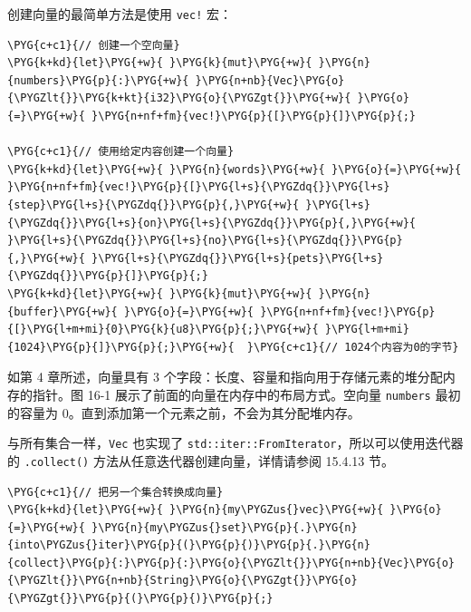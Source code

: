 创建向量的最简单方法是使用 \texttt{vec!} 宏：

\begin{Verbatim}[commandchars=\\\{\},breaklines=true,breakanywhere=true,fontsize=\codefont,xleftmargin=17bp]
\PYG{c+c1}{// 创建一个空向量}
\PYG{k+kd}{let}\PYG{+w}{ }\PYG{k}{mut}\PYG{+w}{ }\PYG{n}{numbers}\PYG{p}{:}\PYG{+w}{ }\PYG{n+nb}{Vec}\PYG{o}{\PYGZlt{}}\PYG{k+kt}{i32}\PYG{o}{\PYGZgt{}}\PYG{+w}{ }\PYG{o}{=}\PYG{+w}{ }\PYG{n+nf+fm}{vec!}\PYG{p}{[}\PYG{p}{]}\PYG{p}{;}

\PYG{c+c1}{// 使用给定内容创建一个向量}
\PYG{k+kd}{let}\PYG{+w}{ }\PYG{n}{words}\PYG{+w}{ }\PYG{o}{=}\PYG{+w}{ }\PYG{n+nf+fm}{vec!}\PYG{p}{[}\PYG{l+s}{\PYGZdq{}}\PYG{l+s}{step}\PYG{l+s}{\PYGZdq{}}\PYG{p}{,}\PYG{+w}{ }\PYG{l+s}{\PYGZdq{}}\PYG{l+s}{on}\PYG{l+s}{\PYGZdq{}}\PYG{p}{,}\PYG{+w}{ }\PYG{l+s}{\PYGZdq{}}\PYG{l+s}{no}\PYG{l+s}{\PYGZdq{}}\PYG{p}{,}\PYG{+w}{ }\PYG{l+s}{\PYGZdq{}}\PYG{l+s}{pets}\PYG{l+s}{\PYGZdq{}}\PYG{p}{]}\PYG{p}{;}
\PYG{k+kd}{let}\PYG{+w}{ }\PYG{k}{mut}\PYG{+w}{ }\PYG{n}{buffer}\PYG{+w}{ }\PYG{o}{=}\PYG{+w}{ }\PYG{n+nf+fm}{vec!}\PYG{p}{[}\PYG{l+m+mi}{0}\PYG{k}{u8}\PYG{p}{;}\PYG{+w}{ }\PYG{l+m+mi}{1024}\PYG{p}{]}\PYG{p}{;}\PYG{+w}{  }\PYG{c+c1}{// 1024个内容为0的字节}
\end{Verbatim}

如第 4 章所述，向量具有 3 个字段：长度、容量和指向用于存储元素的堆分配内存的指针。图 16-1 展示了前面的向量在内存中的布局方式。空向量 \texttt{numbers} 最初的容量为 0。直到添加第一个元素之前，不会为其分配堆内存。


与所有集合一样，\texttt{Vec} 也实现了 \texttt{std::iter::FromIterator}，所以可以使用迭代器的 \texttt{.collect()} 方法从任意迭代器创建向量，详情请参阅 15.4.13 节。

\begin{Verbatim}[commandchars=\\\{\},breaklines=true,breakanywhere=true,fontsize=\codefont,xleftmargin=17bp]
\PYG{c+c1}{// 把另一个集合转换成向量}
\PYG{k+kd}{let}\PYG{+w}{ }\PYG{n}{my\PYGZus{}vec}\PYG{+w}{ }\PYG{o}{=}\PYG{+w}{ }\PYG{n}{my\PYGZus{}set}\PYG{p}{.}\PYG{n}{into\PYGZus{}iter}\PYG{p}{(}\PYG{p}{)}\PYG{p}{.}\PYG{n}{collect}\PYG{p}{:}\PYG{p}{:}\PYG{o}{\PYGZlt{}}\PYG{n+nb}{Vec}\PYG{o}{\PYGZlt{}}\PYG{n+nb}{String}\PYG{o}{\PYGZgt{}}\PYG{o}{\PYGZgt{}}\PYG{p}{(}\PYG{p}{)}\PYG{p}{;}
\end{Verbatim}

